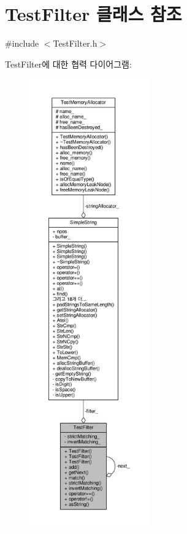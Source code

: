 \hypertarget{class_test_filter}{}\section{Test\+Filter 클래스 참조}
\label{class_test_filter}


{\ttfamily \#include $<$Test\+Filter.\+h$>$}



Test\+Filter에 대한 협력 다이어그램\+:
\nopagebreak
\begin{figure}[H]
\begin{center}
\leavevmode
\includegraphics[height=550pt]{class_test_filter__coll__graph}
\end{center}
\end{figure}
